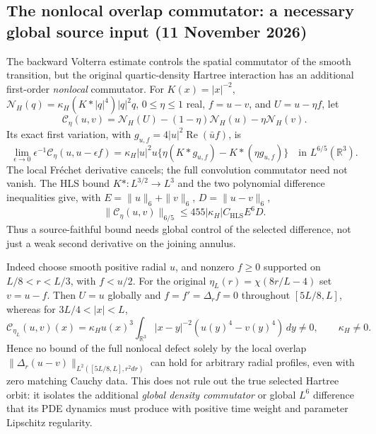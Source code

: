 \subsection*{The nonlocal overlap commutator: a necessary global source input (11 November 2026)}
\noindent
The backward Volterra estimate controls the spatial commutator of the
smooth transition, but the original quartic-density Hartree interaction
has an additional first-order \emph{nonlocal} commutator.
For $K(x)=|x|^{-2}$, $\mathcal N_H(q)=\kappa_H(K*|q|^4)|q|^2q$,
$0\le\eta\le1$ real, $f=u-v$, and $U=u-\eta f$, let
\[
 \mathcal C_\eta(u,v)
 =\mathcal N_H(U)-(1-\eta)\mathcal N_H(u)-\eta\mathcal N_H(v).
\]
Its exact first variation, with $g_{u,f}=4|u|^2\operatorname{Re}(\bar uf)$,
is
\[
 \lim_{\epsilon\to0}\epsilon^{-1}\mathcal C_\eta(u,u-\epsilon f)
 =\kappa_H|u|^2u\{\eta(K*g_{u,f})-K*(\eta g_{u,f})\}
 \quad\text{in }L^{6/5}(\mathbb R^3).
 \tag{NC-A}
\]
The local Fr\'echet derivative cancels; the full convolution commutator
need not vanish. The HLS bound $K*:L^{3/2}\to L^3$ and the two
polynomial difference inequalities give, with
$E=\|u\|_6+\|v\|_6$, $D=\|u-v\|_6$,
\[
 \|\mathcal C_\eta(u,v)\|_{6/5}
 \le455|\kappa_H|C_{\mathrm{HLS}}E^6D .
 \tag{NC-B}
\]
Thus a source-faithful bound needs global control of the selected
difference, not just a weak second derivative on the joining annulus.

Indeed choose smooth positive radial $u$, and nonzero $f\ge0$ supported
on $L/8<r<L/3$, with $f<u/2$. For the original
$\eta_L(r)=\chi(8r/L-4)$ set $v=u-f$. Then $U=u$ globally and
$f=f'=\Delta_r f=0$ throughout $[5L/8,L]$, whereas for
$3L/4<|x|<L$,
\[
 \mathcal C_{\eta_L}(u,v)(x)
 =\kappa_H u(x)^3
  \int_{\mathbb R^3}|x-y|^{-2}(u(y)^4-v(y)^4)\,dy
 \ne0,\qquad \kappa_H\ne0 .
 \tag{NC-C}
\]
Hence no bound of the full nonlocal defect solely by the local overlap
$\|\Delta_r(u-v)\|_{L^2([5L/8,L],r^2dr)}$ can hold for
arbitrary radial profiles, even with zero matching Cauchy data.
This does not rule out the true selected Hartree orbit: it isolates the
additional \emph{global density commutator} or global $L^6$ difference
that its PDE dynamics must produce with positive time weight and
parameter Lipschitz regularity. 
